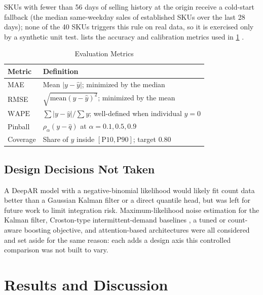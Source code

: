 \documentclass[conference]{IEEEtran}
\newcommand{\WAPE}{\mathrm{WAPE}}
\begin{document}
SKUs with fewer than 56 days of selling history at the origin receive a cold-start fallback (the
median same-weekday sales of established SKUs over the last 28 days); none of the 40 SKUs triggers
this rule on real data, so it is exercised only by a synthetic unit test.  lists
the accuracy and calibration metrics used in \cref{sec:results} \cite{hyndman2006}.

\begin{table}[t]
\centering
\caption{Evaluation Metrics}
\label{tab:metrics}
\footnotesize
\begin{tabularx}{\columnwidth}{@{}l X@{}}
\toprule
Metric & Definition \\
\midrule
MAE & Mean $|y-\hat{y}|$; minimized by the median \\
RMSE & $\sqrt{\text{mean}(y-\hat{y})^2}$; minimized by the mean \\
$\WAPE$ & $\sum|y-\hat{y}|/\sum y$; well-defined when individual $y{=}0$ \\
Pinball & $\rho_\alpha(y-\hat{q})$ at $\alpha=0.1,0.5,0.9$ \\
Coverage & Share of $y$ inside $[\mathrm{P10},\mathrm{P90}]$; target $0.80$ \\
\bottomrule
\end{tabularx}
\end{table}

\subsection{Design Decisions Not Taken}
A DeepAR model with a negative-binomial likelihood would likely fit count data better than a
Gaussian Kalman filter or a direct quantile head, but was left for future work to limit integration
risk. Maximum-likelihood noise estimation for the Kalman filter, Croston-type intermittent-demand
baselines \cite{croston1972,syntetos2005}, a tuned or count-aware boosting objective, and
attention-based architectures \cite{lim2021} were all considered and set aside for the same reason:
each adds a design axis this controlled comparison was not built to vary.

\section{Results and Discussion}
\label{sec:results}
\end{document}
